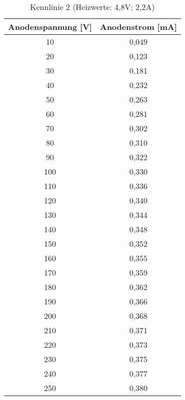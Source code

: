 \begin{table}[h]
	\begin{center}
		\begin{tabular}{cc}
			Anodenspannung [V] & Anodenstrom [mA]\\ \hline
			10	&0,049\\
			20	&0,123\\
			30	&0,181\\
			40	&0,232\\
			50	&0,263\\
			60	&0,281\\
			70	&0,302\\
			80	&0,310\\
			90	&0,322\\
			100	&0,330\\
			110	&0,336\\
			120	&0,340\\
			130	&0,344\\
			140	&0,348\\
			150	&0,352\\
			160	&0,355\\
			170	&0,359\\
			180	&0,362\\
			190	&0,366\\
			200	&0,368\\
			210	&0,371\\
			220	&0,373\\
			230	&0,375\\
			240	&0,377\\
			250	&0,380
		\end{tabular}
		\caption{Kennlinie 2 (Heizwerte: 4,8V; 2,2A)}
		\label{taba2}
	\end{center}
\end{table}